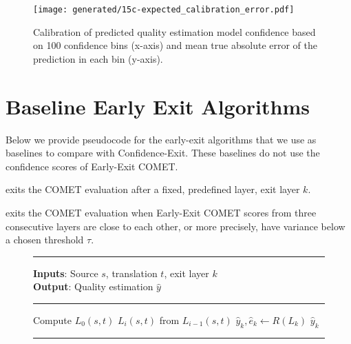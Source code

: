 \begin{figure}[h]
    \centering
    \texttt{[image: generated/15c-expected\_calibration\_error.pdf]}
    \caption{Calibration of predicted quality estimation model confidence based on 100 confidence bins (x-axis) and mean true absolute error of the prediction in each bin (y-axis).
    }
    \label{fig:15c-expected_calibration_error}
\end{figure}

\section{Baseline Early Exit Algorithms}
\label{app:early_exit_algorithms}

Below we provide pseudocode for the early-exit algorithms that we use as baselines to compare with Confidence-Exit. These baselines do not use the confidence scores of Early-Exit COMET.

 exits the COMET evaluation after a fixed, predefined layer, exit layer $k$. 

 exits the COMET evaluation when Early-Exit COMET scores from three consecutive layers are close to each other, or more precisely, have variance below a chosen threshold $\tau$.


\begin{figure}[ht!]
{
\small
\hrule
\vspace{1mm}
\textbf{Inputs}: Source $s$, translation $t$, exit layer $k$ \\
\textbf{Output}: Quality estimation $\hat{y}$ 
\vspace{1mm}
\hrule
\vspace{1mm}
\begin{algorithmic}[1]

\State Compute $L_0(s, t)$
    $L_i(s,t)$ from $L_{i-1}(s,t)$ 
\EndFor    
\State $\hat{y}_k, \hat{e}_k \gets R(L_k)$ 
\State \Return  $\hat{y}_{k}$ 
\end{algorithmic}
}
\vspace{1mm}
\hrule
\vspace{1mm}

\label{alg:constant_algorithm}

\end{figure}


